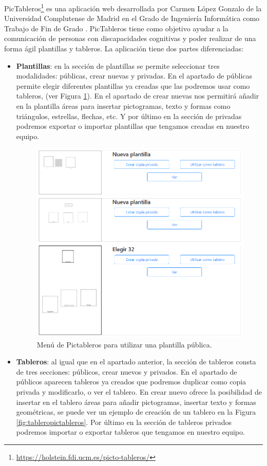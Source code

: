 PicTableros\footnote{\url{https://holstein.fdi.ucm.es/picto-tableros/}} es una aplicación web desarrollada por Carmen López Gonzalo de la Universidad Complutense de Madrid en el Grado de Ingeniería Informática como Trabajo de Fin de Grado \citep{TFGPicTableros}. PicTableros tiene como objetivo ayudar a la comunicación de personas con discapacidades cognitivas y poder realizar de una forma ágil plantillas y tableros. 
La aplicación tiene dos partes diferenciadas:
\begin{itemize}
	\item \textbf{Plantillas}: en la sección de plantillas se permite seleccionar tres modalidades: públicas, crear nuevas y privadas. En el apartado de públicas permite elegir diferentes plantillas ya creadas que las podremos usar como tableros, (ver Figura \ref{fig:pictablerosplantilla}). 
	En el apartado de crear nuevas nos permitirá añadir en la plantilla áreas para insertar pictogramas, texto y formas como triángulos, estrellas, flechas, etc. Y por último en la sección  de privadas podremos exportar o importar plantillas que tengamos creadas en nuestro equipo.
	
	\begin{figure}[h!]
		\centering
		\includegraphics[width=0.7\linewidth]{Imagenes/Bitmap/PictablerosPlantilla}
		\caption{Menú de Pictableros para utilizar una plantilla pública.}
		\label{fig:pictablerosplantilla}
	\end{figure}
	
	
	\item \textbf{Tableros}: al igual que en el apartado anterior, la sección de tableros consta de tres secciones: públicos, crear nuevos y privados. En el apartado de públicos aparecen tableros ya creados que podremos duplicar como copia privada y modificarlo, o ver el tablero. En crear nuevo ofrece la posibilidad de insertar en el tablero áreas para añadir pictogramas, insertar texto y formas geométricas, se puede ver un ejemplo de creación de un tablero en la Figura \ref{fig:tableropictableros}. Por último en la sección de tableros privados podremos importar o exportar tableros que tengamos en nuestro equipo.
	

\end{itemize}
